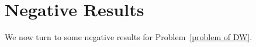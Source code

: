 \documentclass[11pt]{amsart}
\newtheorem{lemma}[theorem]{Lemma}
\theoremstyle{definition}
\theoremstyle{remark}
\numberwithin{equation}{section}
\def\dgnb{{\mathrm{dgnb}}}
\def\gnb#1{G_{\langle #1\rangle}}
\def\otr#1#2{T_{\mathcal{#1}}^{#2}}
\begin{document}



\section{Negative Results}

We now turn to some negative results for Problem~\ref{problem of DW}.
\end{document}
